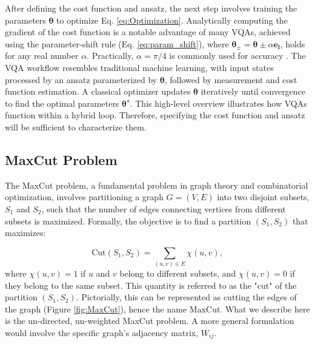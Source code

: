  After defining the cost function and ansatz, the next step involves training the parameters \(\boldsymbol{\theta}\) to optimize Eq. \ref{eq:Optimization}. Analytically computing the gradient of the cost function is a notable advantage of many VQAs, achieved using the parameter-shift rule (Eq. \ref{eq:param_shift}), where \(\boldsymbol{\theta_{\pm}} = \boldsymbol{\theta} \pm \alpha \boldsymbol{e_l}\), holds for any real number \(\alpha\). Practically, \(\alpha = \pi/4\) is commonly used for accuracy \cite{Cerezo_2021}. The VQA workflow resembles traditional machine learning, with input states processed by an ansatz parameterized by \(\boldsymbol{\theta}\), followed by measurement and cost function estimation. A classical optimizer updates \(\boldsymbol{\theta}\) iteratively until convergence to find the optimal parameters \(\boldsymbol{\theta}^{\star}\). This high-level overview illustrates how VQAs function within a hybrid loop. Therefore, specifying the cost function and ansatz will be sufficient to characterize them.


\subsection{MaxCut Problem}
\label{sec: MaxCut}
The MaxCut problem, a fundamental problem in graph theory and combinatorial optimization, involves partitioning a graph \( G = (V, E) \) into two disjoint subsets, \( S_1 \) and \( S_2 \), such that the number of edges connecting vertices from different subsets is maximized. Formally, the objective is to find a partition \( (S_1, S_2) \) that maximizes:

\begin{equation}\label{eq:Cut}\tag{4}
\text{Cut}(S_1, S_2) = \sum_{(u, v) \in E} \chi(u, v),
\end{equation}
where \( \chi(u, v) = 1 \) if \( u \) and \( v \) belong to different subsets, and \( \chi(u, v) = 0 \) if they belong to the same subset. This quantity is referred to as the "cut" of the partition $(S_1, S_2)$. Pictorially, this can be represented as cutting the edges of the graph (Figure \ref{fig:MaxCut}), hence the name MaxCut. What we describe here is the un-directed, un-weighted MaxCut problem. A more general formulation would involve the specific graph's adjacency matrix, $W_{ij}$. %

